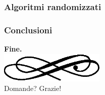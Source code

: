 \begin{frame}
  \frametitle{Algoritmi randomizzati}
\end{frame}

\begin{frame}
  \frametitle{Conclusioni}
\end{frame}

\begin{frame}
  \begin{center}
	\textbf{\calligra\Huge Fine.}\\
  \includegraphics[width=5cm]{img/ornament.eps}\\[1cm]
	\pause
	{\huge\calligra Domande?\pause{} Grazie!}
  \end{center}
\end{frame}
